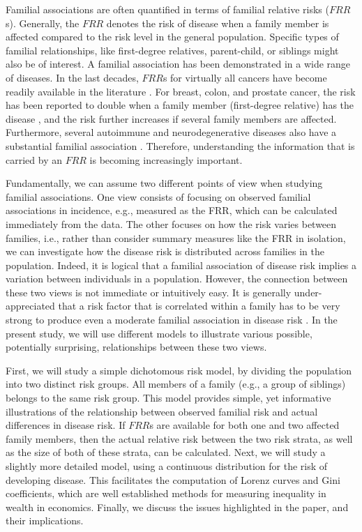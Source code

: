 \documentclass{bmcart}
\begin{document}
Familial associations are often quantified in terms of familial relative risks ($FRR$s). Generally, the $FRR$ denotes the risk of disease when a family member is affected compared to the risk level in the general population. Specific types of familial relationships, like first-degree relatives, parent-child, or siblings might also be of interest.  A familial association has been demonstrated in a wide range of diseases. In the last decades, $FRR$s for virtually all cancers have become readily available in the literature \cite{frank2015population}. For breast, colon, and prostate cancer, the risk has been reported to double when a family member (first-degree relative) has the disease \cite{frank2015population,jasperson2010hereditary, ripperger2009breast,johns2003systematic}, and the risk further increases if several family members are affected. Furthermore, several autoimmune and neurodegenerative diseases also have a substantial familial association \cite{hemminki2009familialALS,marder1996risk}. Therefore, understanding the information that is carried by an $FRR$ is becoming increasingly important.

Fundamentally, we can assume two different points of view when studying familial associations. One view consists of focusing on observed familial associations in incidence, e.g., measured as the FRR, which can be calculated immediately from the data. The other focuses on how the risk varies between families, i.e., rather than consider summary measures like the FRR in isolation, we can investigate how the disease risk is distributed across families in the population. Indeed, it is logical that a familial association of disease risk implies a variation between individuals in a population. However, the connection between these two views is not immediate or intuitively easy. It is generally under-appreciated that a risk factor that is correlated within a family has to be very strong to produce even a moderate familial association in disease risk \cite{khoury1988can,aalen1991modelling,hopper1992familial}. In the present study, we will use different models to illustrate various possible, potentially surprising, relationships between these two views. 

First, we will study a simple dichotomous risk model, by dividing the population into two distinct risk groups. All members of a family (e.g., a group of siblings) belongs to the same risk group. This model provides simple, yet informative illustrations of the relationship between observed familial risk and actual differences in disease risk. If $FRR$s are available for both one and two affected family members, then the actual relative risk between the two risk strata, as well as the size of both of these strata, can be calculated.  Next, we will study a slightly more detailed model, using a continuous distribution for the risk of developing disease. This facilitates the computation of Lorenz curves and Gini coefficients, which are well established methods for measuring inequality in wealth in economics. Finally, we discuss the issues highlighted in the paper, and their implications.
\end{document}

